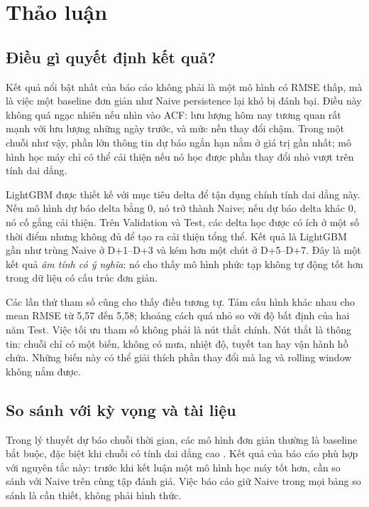 \section{Thảo luận}
\label{sec:discussion}

\subsection{Điều gì quyết định kết quả?}

Kết quả nổi bật nhất của báo cáo không phải là một mô hình có RMSE thấp, mà là việc
một baseline đơn giản như Naive persistence lại khó bị đánh bại. Điều này không quá
ngạc nhiên nếu nhìn vào ACF: lưu lượng hôm nay tương quan rất mạnh với lưu lượng
những ngày trước, và mức nền thay đổi chậm. Trong một chuỗi như vậy, phần lớn thông
tin dự báo ngắn hạn nằm ở giá trị gần nhất; mô hình học máy chỉ có thể cải thiện nếu
nó học được phần thay đổi nhỏ vượt trên tính dai dẳng.

LightGBM được thiết kế với mục tiêu delta để tận dụng chính tính dai dẳng này. Nếu
mô hình dự báo delta bằng 0, nó trở thành Naive; nếu dự báo delta khác 0, nó cố gắng
cải thiện. Trên Validation và Test, các delta học được có ích ở một số thời điểm
nhưng không đủ để tạo ra cải thiện tổng thể. Kết quả là LightGBM gần như trùng Naive
ở D+1--D+3 và kém hơn một chút ở D+5--D+7. Đây là một kết quả \emph{âm tính có ý
nghĩa}: nó cho thấy mô hình phức tạp không tự động tốt hơn trong dữ liệu có cấu
trúc đơn giản.

Các lần thử tham số cũng cho thấy điều tương tự. Tám cấu hình khác nhau cho mean
RMSE từ 5,57 đến 5,58; khoảng cách quá nhỏ so với độ bất định của hai năm Test. Việc
tối ưu tham số không phải là nút thắt chính. Nút thắt là thông tin: chuỗi chỉ có
một biến, không có mưa, nhiệt độ, tuyết tan hay vận hành hồ chứa. Những biến này có
thể giải thích phần thay đổi mà lag và rolling window không nắm được.

\subsection{So sánh với kỳ vọng và tài liệu}

Trong lý thuyết dự báo chuỗi thời gian, các mô hình đơn giản thường là baseline bắt
buộc, đặc biệt khi chuỗi có tính dai dẳng cao \cite{hyndman2021}. Kết quả của báo cáo
phù hợp với nguyên tắc này: trước khi kết luận một mô hình học máy tốt hơn, cần so
sánh với Naive trên cùng tập đánh giá. Việc báo cáo giữ Naive trong mọi bảng so sánh
là cần thiết, không phải hình thức.

